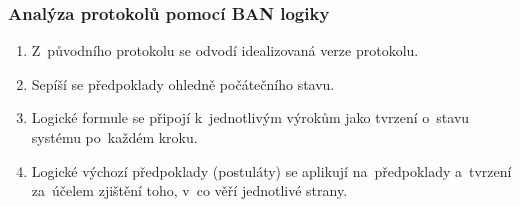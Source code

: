 \subsubsection{Analýza protokolů pomocí BAN logiky}

\begin{enumerate}
\item Z~původního protokolu se odvodí idealizovaná verze protokolu.
\item Sepíší se předpoklady ohledně počátečního stavu.
\item Logické formule se připojí k~jednotlivým výrokům jako tvrzení o~stavu systému po~každém kroku.
\item Logické výchozí předpoklady (postuláty) se aplikují na~předpoklady a~tvrzení za~účelem zjištění toho, v~co věří jednotlivé strany.
\end{enumerate}

